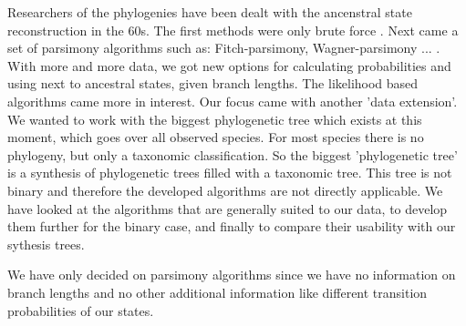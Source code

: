   Researchers of the phylogenies have been dealt with the ancenstral state reconstruction in the 60s.
  The first methods were only brute force . Next came 
  a set of parsimony algorithms such as: Fitch-parsimony, Wagner-parsimony ... .
  With more and more data, we got new options for calculating probabilities and using next to ancestral states, given branch lengths. The likelihood based algorithms came more in interest.
  Our focus came with another 'data extension'. We wanted to work with the biggest phylogenetic tree which exists at this moment, which goes over all observed species.
  For most species there is no phylogeny, but only a taxonomic classification. So the biggest 'phylogenetic tree' is a synthesis of phylogenetic trees filled with a taxonomic tree.
   This tree is not binary and therefore the developed algorithms are not directly applicable.
  We have looked at the algorithms that are generally suited to our data, to develop them further for the binary case, and finally to compare their usability with our sythesis trees.

  We have only decided on parsimony algorithms since we have no information on branch lengths and no other additional information like different transition probabilities of our states.







